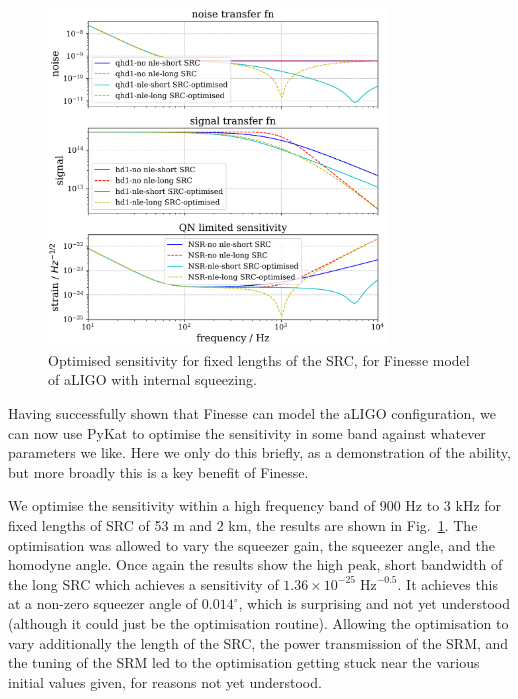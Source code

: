 \documentclass[aps,pra,superscriptaddress,reprint,nofootinbib]{revtex4-1}
\begin{document}
\begin{figure}
	\begin{center}
	\includegraphics[width=0.8\textwidth]{figures/aLIGO_optimum_sensitivity_comparison.pdf}
	\end{center}
	\caption{Optimised sensitivity for fixed lengths of the SRC, for Finesse model of aLIGO with internal squeezing.}
	\label{fig:aLIGO_optimum_sensitivity_comparison}
\end{figure}

Having successfully shown that Finesse can model the aLIGO configuration, we can now use PyKat to optimise the sensitivity in some band against whatever parameters we like. Here we only do this briefly, as a demonstration of the ability, but more broadly this is a key benefit of Finesse.


We optimise the sensitivity within a high frequency band of 900 Hz to 3 kHz for fixed lengths of SRC of 53 m and 2 km, the results are shown in Fig.~\ref{fig:aLIGO_optimum_sensitivity_comparison}. The optimisation was allowed to vary the squeezer gain, the squeezer angle, and the homodyne angle. Once again the results show the high peak, short bandwidth of the long SRC which achieves a sensitivity of $1.36 \times 10^{-25}\; \mathrm{Hz}^{-0.5}$. It achieves this at a non-zero squeezer angle of $0.014^\circ$, which is surprising and not yet understood (although it could just be the optimisation routine). Allowing the optimisation to vary additionally the length of the SRC, the power transmission of the SRM, and the tuning of the SRM led to the optimisation getting stuck near the various initial values given, for reasons not yet understood.
\end{document}
